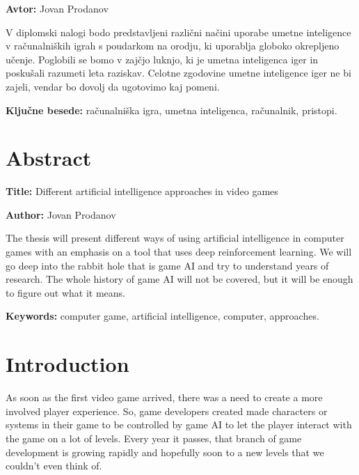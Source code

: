 \documentclass[a4paper, 12pt]{book}
\newcommand{\ttitleEn}{Different artificial intelligence approaches in video games}
\newcommand{\tauthor}{Jovan Prodanov}
\newcommand{\tkeywords}{računalniška igra, umetna inteligenca, računalnik, pristopi}
\newcommand{\tkeywordsEn}{computer game, artificial intelligence, computer, approaches}
\newcommand{\clearemptydoublepage}{\newpage{\pagestyle{empty}\cleardoublepage}}
\begin{document}
\noindent\textbf{Avtor:} \tauthor
\bigskip

\noindent 
V diplomski nalogi bodo predstavljeni različni načini uporabe umetne inteligence v računalniških igrah s poudarkom na orodju, ki uporablja globoko okrepljeno učenje. Poglobili se bomo v zajčjo luknjo, ki je umetna inteligenca iger in poskušali razumeti leta raziskav. Celotne zgodovine umetne inteligence iger ne bi zajeli, vendar bo dovolj da ugotovimo kaj pomeni.
\bigskip

\noindent\textbf{Ključne besede:} \tkeywords.
\clearemptydoublepage



\chapter*{Abstract}

\noindent\textbf{Title:} \ttitleEn
\bigskip

\noindent\textbf{Author:} \tauthor
\bigskip

\noindent 
The thesis will present different ways of using artificial intelligence in computer games with an emphasis on a tool that uses deep reinforcement learning.
We will go deep into the rabbit hole that is game AI and try to understand years of research. The whole history of game AI will not be covered, but it will be enough to figure out what it means.
\bigskip



\noindent\textbf{Keywords:} \tkeywordsEn.
\clearemptydoublepage



\mainmatter
\setcounter{page}{1}
\pagestyle{fancy}


\chapter{Introduction}

As soon as the first video game arrived, there was a need to create a more involved player experience. So, game developers created made characters or systems in their game to be controlled by game AI to let the player interact with the game on a lot of levels. Every year it passes, that branch of game development is growing rapidly and hopefully soon to a new levels that we couldn't even think of.
\end{document}
